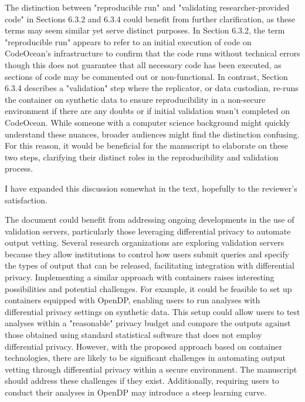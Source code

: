 \begin{referee}


    The distinction between "reproducible run" and "validating researcher-provided code" in Sections 6.3.2 and 6.3.4 could benefit from further clarification, as these terms may seem similar yet serve distinct purposes.  In Section 6.3.2, the term "reproducible run" appears to refer to an initial execution of code on CodeOcean's infrastructure to confirm that the code runs without technical errors though this does not guarantee that all necessary code has been executed, as sections of code may be commented out or non-functional.  In contrast, Section 6.3.4 describes a "validation" step where the replicator, or data custodian, re-runs the container on synthetic data to ensure reproducibility in a non-secure environment if there are any doubts or if initial validation wasn't completed on CodeOcean.  While someone with a computer science background might quickly understand these nuances, broader audiences might find the distinction confusing. For this reason, it would be beneficial for the manuscript to elaborate on these two steps, clarifying their distinct roles in the reproducibility and validation process. 
\end{referee}

\begin{response}
    I have expanded this discussion somewhat in the text, hopefully to the reviewer's satisfaction.
\end{response}

\begin{referee}

    The document could benefit from addressing ongoing developments in the use of validation servers, particularly those leveraging differential privacy to automate output vetting.  Several research organizations are exploring validation servers because they allow institutions to control how users submit queries and specify the types of output that can be released, facilitating integration with differential privacy.  Implementing a similar approach with containers raises interesting possibilities and potential challenges. For example, it could be feasible to set up containers equipped with OpenDP, enabling users to run analyses with differential privacy settings on synthetic data.  This setup could allow users to test analyses within a "reasonable" privacy budget and compare the outputs against those obtained using standard statistical software that does not employ differential privacy. However, with the proposed approach based on container technologies, there are likely to be significant challenges in automating output vetting through differential privacy within a secure environment. The manuscript should address these challenges if they exist.  Additionally, requiring users to conduct their analyses in OpenDP may introduce a steep learning curve. 
\end{referee}

